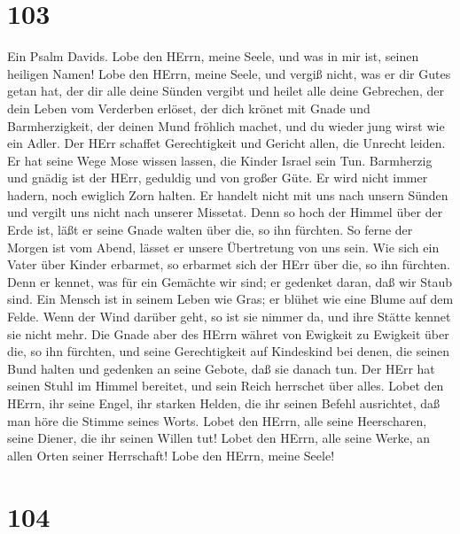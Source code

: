 \hypertarget{section-102}{%
\section{103}\label{section-102}}

 Ein Psalm Davids. Lobe den HErrn, meine Seele, und was in
mir ist, seinen heiligen Namen!  Lobe den HErrn, meine
Seele, und vergiß nicht, was er dir Gutes getan hat,  der
dir alle deine Sünden vergibt und heilet alle deine Gebrechen,
 der dein Leben vom Verderben erlöset, der dich krönet mit
Gnade und Barmherzigkeit,  der deinen Mund fröhlich machet,
und du wieder jung wirst wie ein Adler.  Der HErr schaffet
Gerechtigkeit und Gericht allen, die Unrecht leiden.  Er hat
seine Wege Mose wissen lassen, die Kinder Israel sein Tun. 
Barmherzig und gnädig ist der HErr, geduldig und von großer Güte.
 Er wird nicht immer hadern, noch ewiglich Zorn halten.
 Er handelt nicht mit uns nach unsern Sünden und vergilt
uns nicht nach unserer Missetat.  Denn so hoch der Himmel
über der Erde ist, läßt er seine Gnade walten über die, so ihn fürchten.
 So ferne der Morgen ist vom Abend, lässet er unsere
Übertretung von uns sein.  Wie sich ein Vater über Kinder
erbarmet, so erbarmet sich der HErr über die, so ihn fürchten.
 Denn er kennet, was für ein Gemächte wir sind; er gedenket
daran, daß wir Staub sind.  Ein Mensch ist in seinem Leben
wie Gras; er blühet wie eine Blume auf dem Felde.  Wenn der
Wind darüber geht, so ist sie nimmer da, und ihre Stätte kennet sie
nicht mehr.  Die Gnade aber des HErrn währet von Ewigkeit
zu Ewigkeit über die, so ihn fürchten, und seine Gerechtigkeit auf
Kindeskind  bei denen, die seinen Bund halten und gedenken
an seine Gebote, daß sie danach tun.  Der HErr hat seinen
Stuhl im Himmel bereitet, und sein Reich herrschet über alles.
 Lobet den HErrn, ihr seine Engel, ihr starken Helden, die
ihr seinen Befehl ausrichtet, daß man höre die Stimme seines Worts.
 Lobet den HErrn, alle seine Heerscharen, seine Diener, die
ihr seinen Willen tut!  Lobet den HErrn, alle seine Werke,
an allen Orten seiner Herrschaft! Lobe den HErrn, meine Seele!

\hypertarget{section-103}{%
\section{104}\label{section-103}}

